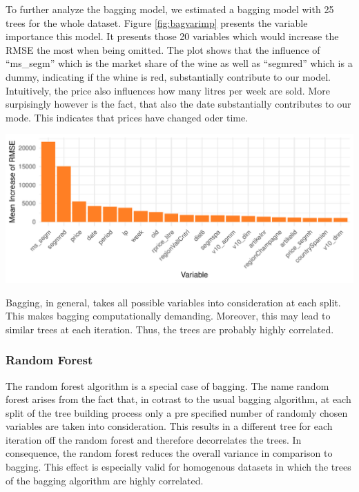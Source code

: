 \documentclass[11pt,]{article}
\let\origfigure\figure
\let\endorigfigure\endfigure
\renewenvironment{figure}[1][2] {
    \expandafter\origfigure\expandafter[H]
} {
    \endorigfigure
}
\begin{document}
To further analyze the \ac{bagging} model, we estimated a \ac{bagging}
model with 25 trees for the whole dataset. Figure \ref{fig:bagvarimp}
presents the variable importance this model. It presents those 20
variables which would increase the \ac{RMSE} the most when being
omitted. The plot shows that the influence of \enquote{ms\_segm} which
is the market share of the wine as well as \enquote{segmred} which is a
dummy, indicating if the whine is red, substantially contribute to our
model. Intuitively, the price also influences how many litres per week
are sold. More surpisingly however is the fact, that also the date
substantially contributes to our mode. This indicates that prices have
changed oder time.

\begin{figure}

\includegraphics{../00_data/output_paper/15_var_imp_bagging} \hfill{}

\caption{\label{fig:bagvarimp}Bagging: Variable Importance.}\label{fig:bag_varimp}
\end{figure}

Bagging, in general, takes all possible variables into consideration at
each split. This makes \ac{bagging} computationally demanding. Moreover,
this may lead to similar trees at each iteration. Thus, the trees are
probably highly correlated.

\hypertarget{random-forest}{%
\subsubsection{\texorpdfstring{Random Forest
\label{chap:rand_for}}{Random Forest }}\label{random-forest}}

The random forest algorithm is a special case of \ac{bagging}. The name
random forest arises from the fact that, in cotrast to the usual
\ac{bagging} algorithm, at each split of the tree building process only
a pre specified number of randomly chosen variables are taken into
consideration. This results in a different tree for each iteration off
the random forest and therefore decorrelates the trees. In consequence,
the random forest reduces the overall variance in comparison to
\ac{bagging}. This effect is especially valid for homogenous datasets in
which the trees of the \ac{bagging} algorithm are highly correlated.
\end{document}
